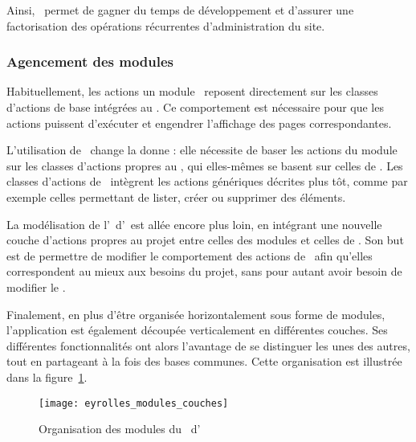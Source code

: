 Ainsi, \asladmin\ permet de gagner du temps de développement et d'assurer une factorisation des opérations récurrentes d'administration du site.


\subsubsection{Agencement des modules}

Habituellement, les actions un module \asf\ reposent directement sur les classes d'actions de base intégrées au \afm. Ce comportement est nécessaire pour que les actions puissent d'exécuter et engendrer l'affichage des pages correspondantes.

L'utilisation de \asladmin\ change la donne : elle nécessite de baser les actions du module sur les classes d'actions propres au \aplugin, qui elles-mêmes se basent sur celles de \asf. Les classes d'actions de \asladmin\ intègrent les actions génériques décrites plus tôt, comme par exemple celles permettant de lister, créer ou supprimer des éléments.

La modélisation de l'\aintranet\ d'\aey\ est allée encore plus loin, en intégrant une nouvelle couche d'actions propres au projet entre celles des modules et celles de \asladmin. Son but est de permettre de modifier le comportement des actions de \asladmin\ afin qu'elles correspondent au mieux aux besoins du projet, sans pour autant avoir besoin de modifier le \aplugin.

Finalement, en plus d'être organisée horizontalement sous forme de modules, l'application est également découpée verticalement en différentes cou\-ches. Ses différentes fonctionnalités ont alors l'avantage de se distinguer les unes des autres, tout en partageant à la fois des bases communes. Cette organisation est illustrée dans la figure~\ref{figure:eyrolles_modules_couches}.

\begin{figure}
	\centering
	\texttt{[image: eyrolles\_modules\_couches]}
	\caption{Organisation des modules du \alotdeux\ d'\aey}
	\label{figure:eyrolles_modules_couches}
\end{figure}
